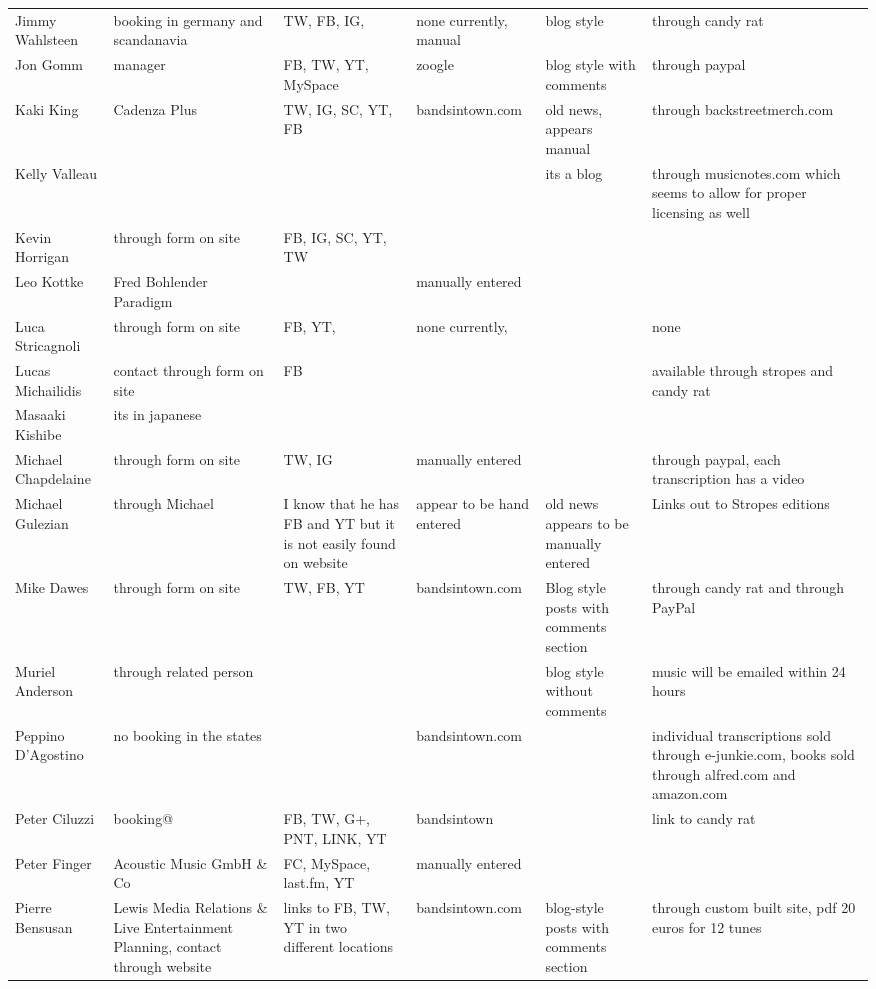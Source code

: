 \documentclass[unicode,hyperfootnotes=false,xetex,colorlinks=true,nofonts,nobib]{tufte-handout}
\begin{document}
\begin{longtable}{p{} p{} p{} p{} p{} p{}}
  Jimmy Wahlsteen & booking in germany and scandanavia & TW, FB, IG,  & none currently, manual & blog style & through candy rat\\
  Jon Gomm & manager & FB, TW, YT, MySpace & zoogle & blog style with comments & through paypal\\
  Kaki King & Cadenza Plus & TW, IG, SC, YT, FB & bandsintown.com & old news, appears manual & through backstreetmerch.com\\
  Kelly Valleau &  &  &  & its a blog & through musicnotes.com which seems to allow for proper licensing as well\\
  Kevin Horrigan & through form on site & FB, IG, SC, YT, TW &  &  & \\
  Leo Kottke & Fred Bohlender Paradigm &  & manually entered &  & \\
  Luca Stricagnoli & through form on site & FB, YT, & none currently, &  & none\\
  Lucas Michailidis & contact through form on site & FB &  &  & available through stropes and candy rat\\
  Masaaki Kishibe & its in japanese &  &  &  & \\
  Michael Chapdelaine & through form on site & TW, IG & manually entered &  & through paypal, each transcription has a video\\
  Michael Gulezian & through Michael & I know that he has FB and YT but it is not easily found on website & appear to be hand entered & old news appears to be manually entered & Links out to Stropes editions\\
  Mike Dawes & through form on site & TW, FB, YT & bandsintown.com & Blog style posts with comments section & through candy rat and through PayPal\\
  Muriel Anderson & through related person &  &  & blog style without comments & music will be emailed within 24 hours\\
  Peppino D’Agostino & no booking in the states &  & bandsintown.com &  & individual transcriptions sold through e-junkie.com, books sold through alfred.com and amazon.com\\
  Peter Ciluzzi & booking@ & FB, TW, G+, PNT, LINK, YT & bandsintown &  & link to candy rat\\
  Peter Finger & Acoustic Music GmbH \& Co & FC, MySpace, last.fm, YT & manually entered & & \\
  Pierre Bensusan & Lewis Media Relations \& Live Entertainment Planning, contact through website & links to FB, TW, YT in two different locations & bandsintown.com & blog-style posts with comments section & through custom built site, pdf 20 euros for 12 tunes\\

\end{longtable}
\end{document}
